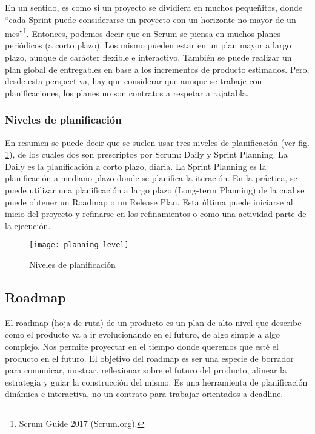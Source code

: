 En un sentido, es como si un proyecto se dividiera en muchos pequeñitos, donde “cada Sprint puede considerarse un proyecto con un horizonte no mayor de un mes”\footnote{Scrum Guide 2017 (Scrum.org).}. Entonces, podemos decir que en Scrum se piensa en muchos planes periódicos (a corto plazo). Los mismo pueden estar en un plan mayor a largo plazo, aunque de carácter flexible e interactivo. También se puede realizar un plan global de entregables en base a los incrementos de producto estimados. Pero, desde esta perspectiva, hay que considerar que aunque se trabaje con planificaciones, los planes no son contratos a respetar a rajatabla.

\subsubsection{Niveles de planificación}

En resumen se puede decir que se suelen usar tres niveles de planificación (ver fig. \ref{fig:planning_level}), de los cuales dos son prescriptos por Scrum: Daily y Sprint Planning. La Daily es la planificación a corto plazo, diaria. La Sprint Planning es la planificación a mediano plazo donde se planifica la iteración. En la práctica, se puede utilizar una planificación a largo plazo (Long-term Planning) de la cual se puede obtener un Roadmap o un Release Plan. Esta última puede iniciarse al inicio del proyecto y refinarse en los refinamientos o como una actividad parte de la ejecución.

\begin{figure}[h]
  \centering
  \texttt{[image: planning\_level]}
  \caption{Niveles de planificación}
  \centering
  \label{fig:planning_level} %
\end{figure}
\FloatBarrier %

\subsection{Roadmap}

El roadmap (hoja de ruta) de un producto es un plan de alto nivel que describe como el producto va a ir evolucionando en el futuro, de algo simple a algo complejo. Nos permite proyectar en el tiempo donde queremos que esté el producto en el futuro. El objetivo del roadmap es ser una especie de borrador para comunicar, mostrar, reflexionar sobre el futuro del producto, alinear la estrategia y guiar la construcción del mismo. Es una herramienta de planificación dinámica e interactiva, no un contrato para trabajar orientados a deadline.

